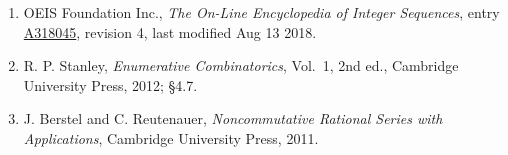 \documentclass[11pt]{article}
\theoremstyle{definition}
\begin{document}
\begin{enumerate}

\item OEIS Foundation Inc., \emph{The On-Line Encyclopedia of Integer Sequences}, entry \href{https://oeis.org/A318045}{A318045}, revision 4, last modified Aug 13 2018.

\item R. P. Stanley, \emph{Enumerative Combinatorics}, Vol.~1, 2nd ed., Cambridge University Press, 2012; \S4.7.

\item J. Berstel and C. Reutenauer, \emph{Noncommutative Rational Series with Applications}, Cambridge University Press, 2011.

\end{enumerate}
\end{document}
